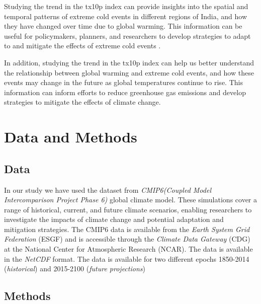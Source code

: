\documentclass[a4paper, 12pt, twoside]{report}
\begin{document}
Studying the trend in the tx10p index can provide insights into the spatial and temporal patterns of extreme cold events in different regions of India, and how they have changed over time due to global warming. This information can be useful for policymakers, planners, and researchers to develop strategies to adapt to and mitigate the effects of extreme cold events  \cite{https://doi.org/10.1002/2016GL067841} \cite{Kumar2020}  \cite{ALEXANDER20164}  \cite{Alexander2006} .

In addition, studying the trend in the tx10p index can help us better understand the relationship between global warming and extreme cold events, and how these events may change in the future as global temperatures continue to rise. This information can inform efforts to reduce greenhouse gas emissions and develop strategies to mitigate the effects of climate change.

\chapter{Data and Methods}


\section{Data}
In our study we have used the dataset from \textit{CMIP6(\textit{Coupled Model Intercomparison Project Phase 6}) }global climate model. These simulations cover a range of historical, current, and future climate scenarios, enabling researchers to investigate the impacts of climate change and potential adaptation and mitigation strategies. The CMIP6 data is available from the \textit{Earth System Grid Federation} (ESGF) and is accessible through the \textit{Climate Data Gateway} (CDG) at the National Center for Atmospheric Research (NCAR). The data is available in the \textit{NetCDF} format. The data is available for two different epochs 1850-2014 (\textit{historical}) and 2015-2100 (\textit{future projections})



\section{Methods}
\end{document}
